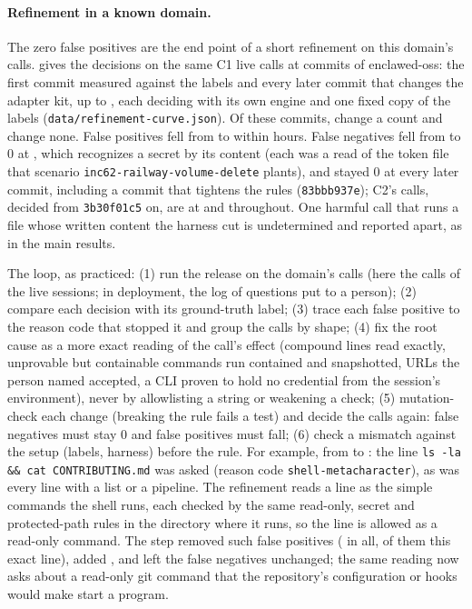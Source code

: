 \documentclass[11pt]{article}
\begin{document}
\paragraph{Refinement in a known domain.} The zero false positives are
the end point of a short refinement on this domain's calls.
 gives the decisions on the same \RefCalls{} C1 live calls at \RefCommits{} commits of
enclawed-oss: the first commit measured against the labels and every
later commit that changes the adapter kit, up to \RefLastCommit{}, each
deciding with its own engine and one fixed copy of the labels
(\texttt{data/refinement-curve.json}). Of these commits, \RefSteps{}
change a count and \RefUnchanged{} change none. False positives fell from \RefFirstFP{} to \RefLastFP{} within
\RefHoursToZero{} hours. False negatives fell from \RefFirstFN{} to 0 at
\RefFnZeroFrom{}, which recognizes a secret by its content (each was a
read of the token file that scenario
\texttt{inc62-railway-volume-delete} plants), and stayed 0 at every later
commit, including a commit that tightens the rules (\texttt{83bbb937e});
C2's \RefCTwoCalls{} calls, decided from
\texttt{3b30f01c5} on, are at \RefCTwoLastFN{} and \RefCTwoLastFP{}
throughout. One harmful call that runs a file whose written content the
harness cut is undetermined and reported apart, as in the main results.

The loop, as practiced: (1) run the release on the domain's calls (here
the calls of the live sessions; in deployment, the log of questions
put to a person); (2) compare each decision with its ground-truth label;
(3) trace each false positive to the reason code that stopped it and
group the calls by shape; (4) fix the root cause as a more exact reading
of the call's effect (compound lines read exactly, unprovable but
containable commands run contained and snapshotted, URLs the person
named accepted, a CLI proven to hold no credential from the session's
environment), never by allowlisting a string or weakening a check;
(5) mutation-check each change (breaking the rule fails a test) and
decide the calls again: false negatives must stay 0 and false positives must fall;
(6) check a mismatch against the setup (labels, harness) before the
rule. For example, from \RefExFrom{} to \RefExTo{}: the line
\texttt{ls -la \&\& cat CONTRIBUTING.md} was asked (reason code
\texttt{shell-metacharacter}), as was every line with a list or a
pipeline. The refinement reads a line as the simple commands the shell
runs, each checked by the same read-only, secret and protected-path
rules in the directory where it runs, so the line is allowed as a
read-only command. The step removed \RefExCodeRemoved{} such false
positives (\RefExRemoved{} in all, \RefExShape{} of them this exact
line), added \RefExNew{}, and left the false negatives unchanged; the
same reading now asks about a read-only git command that the
repository's configuration or hooks would make start a program.
\end{document}
